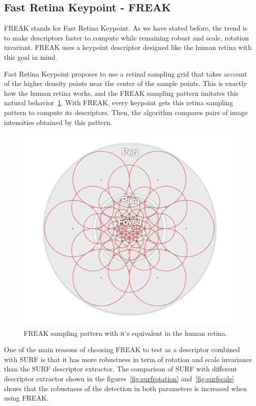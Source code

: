 \subsection{Fast Retina Keypoint - FREAK}
FREAK stands for Fast Retina Keypoint\cite{Ortiz:2012:FFR:2354409.2354903}. As we
have stated before, the trend is to make descriptors faster to compute while
remaining robust and scale, rotation invariant. FREAK uses a keypoint descriptor
designed like the human retina with this goal in mind.

Fast Retina Keypoint proposes to use a retinal sampling grid that takes account of
the higher density points near the center of the sample points. This is exactly how
the human retina works, and the FREAK sampling pattern imitates this natural
behavior~\ref{fig:freak}. With FREAK, every keypoint gets this retina sampling
pattern to compute its descriptors. Then, the algorithm compares pairs of image
intensities obtained by this pattern.

\begin{figure}
\centering
\includegraphics[scale=0.55]{img/freak.png}
\caption{\label{fig:freak}FREAK sampling pattern with it's equivalent in the human
  retina.} 
\end{figure} 

One of the main reasons of choosing FREAK to test as a descriptor combined with
SURF is that it has more robustness in term of rotation and scale
invariance than the SURF descriptor extractor. The
comparison of SURF with different descriptor 
extractor\cite{rotationscaleinv} shown in the figures~\ref{fig:surfrotation}
and~\ref{fig:surfscale}
shows that the robustness of the detection in both parameters is increased when
using FREAK. 

